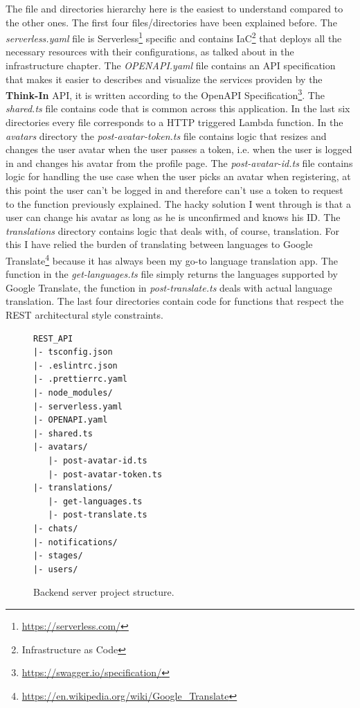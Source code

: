 The file and directories hierarchy here is the easiest to understand compared to the other ones. The first four files/directories have been explained before. The \textit{serverless.yaml}  file is Serverless\footnote{\href{https://serverless.com/}{https://serverless.com/}} specific and contains IaC\footnote{Infrastructure as Code} that deploys all the necessary resources with their configurations, as talked about in the infrastructure chapter. The \textit{OPENAPI.yaml} file contains an API specification that makes it easier to describes and visualize the services providen by the \textbf{Think-In} API, it is written according to the OpenAPI Specification\footnote{\href{https://swagger.io/specification/}{https://swagger.io/specification/}}. The \textit{shared.ts} file contains code that is common across this application. In the last six directories every file corresponds to a HTTP triggered Lambda function. In the \textit{avatars} directory the \textit{post-avatar-token.ts} file contains logic that resizes and changes the user avatar when the user passes a token, i.e. when the user is logged in and changes his avatar from the profile page. The \textit{post-avatar-id.ts} file contains logic for handling the use case when the user picks an avatar when registering, at this point the user can't be logged in and therefore can't use a token to request to the function previously explained. The hacky solution I went through is that a user can change his avatar as long as he is unconfirmed and knows his ID. The \textit{translations} directory contains logic that deals with, of course, translation. For this I have relied the burden of translating between languages to Google Translate\footnote{\href{https://en.wikipedia.org/wiki/Google\_Translate}{https://en.wikipedia.org/wiki/Google\_Translate}} because it has always been my go-to language translation app. The function in the \textit{get-languages.ts} file simply returns the languages supported by Google Translate, the function in \textit{post-translate.ts} deals with actual language translation. The last four directories contain code for functions that respect the REST architectural style constraints.

\begin{figure}[H]
\begin{verbatim}
REST_API
|- tsconfig.json
|- .eslintrc.json
|- .prettierrc.yaml
|- node_modules/
|- serverless.yaml
|- OPENAPI.yaml
|- shared.ts
|- avatars/
   |- post-avatar-id.ts
   |- post-avatar-token.ts
|- translations/
   |- get-languages.ts
   |- post-translate.ts
|- chats/
|- notifications/
|- stages/
|- users/
\end{verbatim}
\caption{Backend server project structure.}
\label{figure:backend-stage-server-project-structure}
\end{figure}

